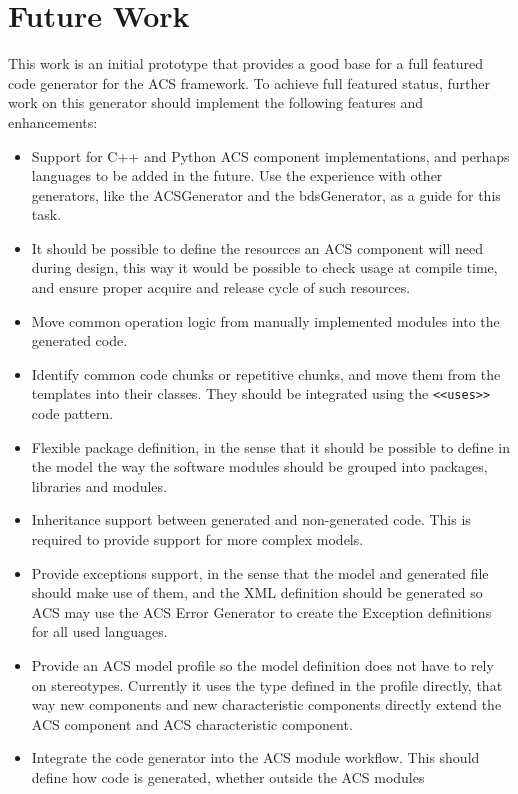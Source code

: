 \section{Future Work}
\label{sec:future-work}
This work is an initial prototype
that provides a good base for a full featured
code generator for the ACS framework.
To achieve full featured status,
further work on this generator should implement
the following features and enhancements:
\begin{itemize}
   \item Support for C++ and Python ACS component implementations,
     and perhaps languages to be added in the future.
     Use the experience with other generators,
     like
     the ACSGenerator and the bdsGenerator,
     as a guide for this task.
   \item It should be possible to define the resources
   an ACS component will need during design, this way it would
   be possible to check usage at compile time, and ensure proper
   acquire and release cycle of such resources.
   \item Move common operation logic from manually implemented
   modules into the generated code.
   \item Identify common code chunks or repetitive chunks,
   and move them from the templates into their classes.
   They should be integrated using
   the \texttt{<<uses>>} code pattern.
   \item Flexible package definition, in the sense that it should be
   possible to define in the model
   the way the software modules should be grouped
   into packages, libraries and modules.
   \item Inheritance support between generated and non-generated code.
   This is required to provide support for more complex models.
   \item Provide exceptions support, in the sense that the model and
   generated file should make use of them, and the XML definition
   should be generated so ACS may use the ACS Error Generator to create
   the Exception definitions for all used languages.
   \item Provide an ACS model profile so the model definition does not
   have to rely on stereotypes.
   Currently it uses the type defined in the profile directly,
   that way new components and new characteristic components directly
   extend the ACS component and ACS characteristic component.
   \item Integrate the code generator into the ACS module workflow.
   This should define how code is generated, whether outside the ACS modules

\end{itemize}
